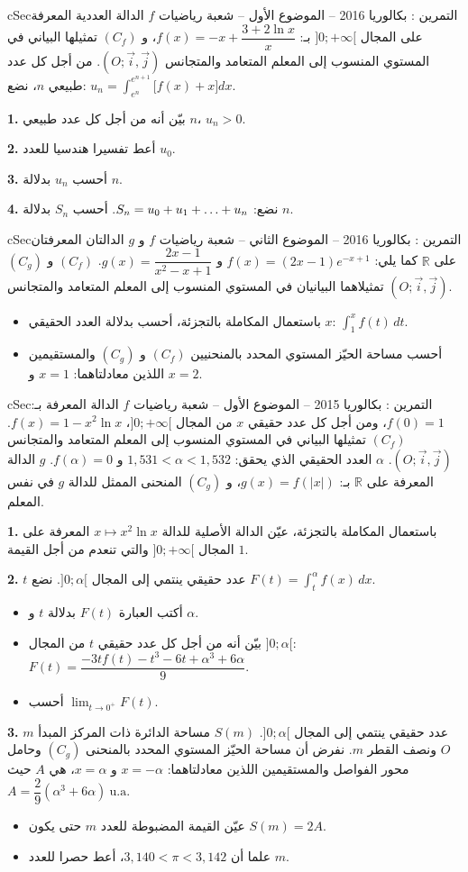 \documentclass[12pt,a4paper]{article}
\newenvironment{BOX}[2]{\begin{otherlanguage}{english}\begin{arbox}{#1}{#2}}{\end{arbox}\end{otherlanguage}}
\newcounter{exo}
\newenvironment{tamrin}[1]{\stepcounter{exo}\begin{BOX}{cSec}{التمرين \theexo: #1}}{\end{BOX}}
\renewcommand{\dots}{\mathinner{\ldotp\ldotp\ldotp}}
\newcommand{\R}{\mathbb{R}}
\newenvironment{sq}{\begin{itemize}[leftmargin=2.4em,itemsep=3pt]}{\end{itemize}}
\newcommand{\qa}{\item[(أ)]}\newcommand{\qb}{\item[(ب)]}\newcommand{\qc}{\item[(جـ)]}\newcommand{\qd}{\item[(د)]}\newcommand{\qe}{\item[(هـ)]}
\newcommand{\QQ}[1]{\par\smallskip\textbf{#1.} }
\begin{document}
\begin{tamrin}{بكالوريا 2016 -- الموضوع الأول -- شعبة رياضيات}
$f$ الدالة العددية المعرفة على المجال $]0;+\infty[$ بـ: $f(x)=-x+\dfrac{3+2\ln x}{x}$، و $(C_f)$ تمثيلها البياني في المستوي المنسوب إلى المعلم المتعامد والمتجانس $(O;\vec i,\vec j)$.
من أجل كل عدد طبيعي $n$، نضع: $u_n=\displaystyle\int_{e^n}^{e^{n+1}}\big[f(x)+x\big]dx$.
\QQ{1} بيّن أنه من أجل كل عدد طبيعي $n$، $u_n>0$.
\QQ{2} أعط تفسيرا هندسيا للعدد $u_0$.
\QQ{3} أحسب $u_n$ بدلالة $n$.
\QQ{4} نضع: $S_n=u_0+u_1+\dots+u_n$. أحسب $S_n$ بدلالة $n$.
\end{tamrin}

\begin{tamrin}{بكالوريا 2016 -- الموضوع الثاني -- شعبة رياضيات}
$f$ و $g$ الدالتان المعرفتان على $\R$ كما يلي: $f(x)=(2x-1)e^{-x+1}$ و $g(x)=\dfrac{2x-1}{x^2-x+1}$.
$(C_f)$ و $(C_g)$ تمثيلاهما البيانيان في المستوي المنسوب إلى المعلم المتعامد والمتجانس $(O;\vec i,\vec j)$.
\begin{sq}
\qa باستعمال المكاملة بالتجزئة، أحسب بدلالة العدد الحقيقي $x$: $\displaystyle\int_1^xf(t)\,dt$.
\qb أحسب مساحة الحيّز المستوي المحدد بالمنحنيين $(C_f)$ و $(C_g)$ والمستقيمين اللذين معادلتاهما: $x=1$ و $x=2$.
\end{sq}
\end{tamrin}

\begin{tamrin}{بكالوريا 2015 -- الموضوع الأول -- شعبة رياضيات}
$f$ الدالة المعرفة بـ: $f(0)=1$، ومن أجل كل عدد حقيقي $x$ من المجال $]0;+\infty[$، $f(x)=1-x^2\ln x$. $(C_f)$ تمثيلها البياني في المستوي المنسوب إلى المعلم المتعامد والمتجانس $(O;\vec i,\vec j)$.
$\alpha$ العدد الحقيقي الذي يحقق: $1{,}531<\alpha<1{,}532$ و $f(\alpha)=0$.
$g$ الدالة المعرفة على $\R$ بـ: $g(x)=f(|x|)$، و $(C_g)$ المنحنى الممثل للدالة $g$ في نفس المعلم.
\QQ{1} باستعمال المكاملة بالتجزئة، عيّن الدالة الأصلية للدالة $x\mapsto x^2\ln x$ المعرفة على المجال $]0;+\infty[$ والتي تنعدم من أجل القيمة $1$.
\QQ{2} $t$ عدد حقيقي ينتمي إلى المجال $]0;\alpha[$. نضع $F(t)=\displaystyle\int_t^\alpha f(x)\,dx$.
\begin{sq}
\qa أكتب العبارة $F(t)$ بدلالة $t$ و $\alpha$.
\qb بيّن أنه من أجل كل عدد حقيقي $t$ من المجال $]0;\alpha[$: $F(t)=\dfrac{-3tf(t)-t^3-6t+\alpha^3+6\alpha}{9}$.
\qc أحسب $\displaystyle\lim_{t\to0^+}F(t)$.
\end{sq}
\QQ{3} $m$ عدد حقيقي ينتمي إلى المجال $]0;\alpha[$. $S(m)$ مساحة الدائرة ذات المركز المبدأ $O$ ونصف القطر $m$.
نفرض أن مساحة الحيّز المستوي المحدد بالمنحنى $(C_g)$ وحامل محور الفواصل والمستقيمين اللذين معادلتاهما: $x=-\alpha$ و $x=\alpha$، هي $A$ حيث $A=\dfrac29(\alpha^3+6\alpha)\ \text{u.a}$.
\begin{sq}
\qa عيّن القيمة المضبوطة للعدد $m$ حتى يكون $S(m)=2A$.
\qb علما أن $3{,}140<\pi<3{,}142$، أعط حصرا للعدد $m$.
\end{sq}
\end{tamrin}
\end{document}
